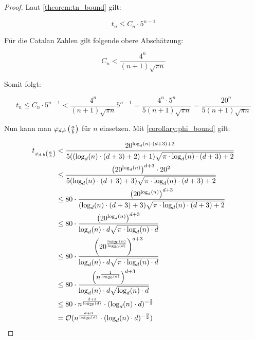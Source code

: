 \documentclass{article}
\theoremstyle{nonumberplain}
\newtheorem{proof}{Beweis}
\begin{document}
\begin{proof}
    Laut \ref{theorem:tn_bound} gilt:

        \[t_n \leq C_n \cdot 5^{n-1}\]

    Für die Catalan Zahlen gilt folgende obere Abschätzung:

        \[C_n < \frac{4^n}{(n+1)\sqrt{\pi n}}\]

    Somit folgt:

        \[t_n \leq C_n \cdot 5^{n-1} < \frac{4^n}{(n+1)\sqrt{\pi n}} 5^{n-1} = \frac{4^n \cdot 5^n}{5(n+1)\sqrt{\pi n}} = \frac{20^n}{5(n+1)\sqrt{\pi n}}\]

    Nun kann man \(\varphi_{d,b}\left(\frac{a}{b}\right)\) für \(n\) einsetzen.
    Mit \ref{corollary:phi_bound} gilt:%

    \begin{align*}
        t_{\measure{\frac{a}{b}}} 
        &< \frac{20^{\log_d(n)\cdot(d+3)+2}}{5((\log_d(n)\cdot(d+3)+2)+1)\sqrt{\pi \cdot \log_d(n)\cdot(d+3)+2}} \\
        &\leq \frac{\left(20^{\log_d(n)}\right)^{d+3}\cdot20^2}{5(\log_d(n)\cdot(d+3)+3)\sqrt{\pi \cdot \log_d(n)\cdot(d+3)+2}} \\
        &\leq 80\cdot\frac{\left(20^{\log_d(n)}\right)^{d+3}}{(\log_d(n)\cdot(d+3)+3)\sqrt{\pi \cdot \log_d(n)\cdot(d+3)+2}} \\
        &\leq 80\cdot\frac{\left(20^{\log_d(n)}\right)^{d+3}}{\log_d(n) \cdot d \sqrt{\pi \cdot \log_d(n) \cdot d}} \\
        &\leq 80\cdot\frac{\left(20^{\frac{\log_{20}(n)}{\log_{20}(d)}}\right)^{d+3}}{\log_d(n) \cdot d \sqrt{\pi \cdot \log_d(n) \cdot d}} \\
        &\leq 80\cdot\frac{\left(n^{\frac{1}{\log_{20}(d)}}\right)^{d+3}}{\log_d(n) \cdot d \sqrt{\log_d(n) \cdot d}} \\
        &\leq 80 \cdot n^{\frac{d+3}{\log_{20}(d)}}\cdot(\log_d(n) \cdot d)^{-\frac{3}{2}} \\
        &= \mathcal{O}(n^{\frac{d+3}{\log_{20}(d)}}\cdot(\log_d(n) \cdot d)^{-\frac{3}{2}}) \\
        
    \end{align*}

\end{proof}
\end{document}
